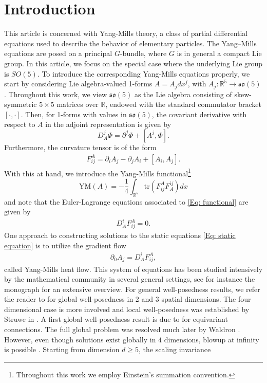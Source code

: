 \documentclass[11pt,reqno]{amsart}
\theoremstyle{remark}
\newcommand{\R}{\mathbb{R}}
\theoremstyle{definition}
\begin{document}
\section{Introduction}
This article is concerned with Yang-Mills theory, a class of partial differential equations used to describe the behavior of elementary particles. The Yang--Mills equations are posed on a principal $G$-bundle, where $G$ is in general a compact Lie group. In this article, we focus on the special case where the underlying Lie group is $SO(5)$. To introduce the corresponding Yang-Mills equations properly, we  start by considering Lie algebra-valued 1-forms $ A=A_j dx^j$, with $A_j: \R^5\to \mathfrak{so}(5)$. Throughout this work, we view $\mathfrak{so}(5)$ as the Lie algebra consisting of skew-symmetric $5\times 5$ matrices over $\R$, endowed with the standard commutator bracket $[\cdot,\cdot].$  Then, for 1-forms with values in $\mathfrak{so}(5)$, the 
covariant derivative with respect to $A$ in the adjoint representation
is given by
\[D^j_A \Phi = \partial^j \Phi + [A^j,\Phi].\]
Furthermore, the curvature tensor is of the form
\begin{align*}
    F_{ij}^A=\partial_i A_j-\partial_j A_i +[A_i,A_j].
\end{align*}
With this at hand, we introduce the Yang-Mills functional\footnote{Throughout this work we employ Einstein's summation convention.}
\begin{equation}\label{Eq: functional}
    \mathrm{YM}(A)=-\frac{1}{4}\int_{\R^5}  \text{tr}(F_{ij}^A F^{ij}_A) dx
\end{equation}
and note that the Euler-Lagrange equations associated to \eqref{Eq: functional} are given by
\begin{align}\label{Eq: static equation}
D^i_A F_{ij}^A=0.
\end{align}
One approach to constructing solutions to the static equations \eqref{Eq: static equation} is to utilize the gradient flow 
\begin{align}\label{Eq: heat flow}
    \partial_0 A_j = D^i_A F_{ij}^A,
\end{align}
called Yang-Mills heat flow. This system of equations has been studied intensively by the mathematical community in several general settings, see for instance the monograph \cite{Fee16} for an extensive overview. For general well-posedness results, we refer the reader to \cite{Rad92} for global well-posedness in 2 and 3 spatial dimensions. The four dimensional case is more involved and local well-posedness was established by Struwe in \cite{Str94}. A first global well-posedness result is due to  \cite{SchStrTah98} for equivariant connections. The full global problem was resolved much later by Waldron \cite{Wal19}. However, even though solutions exist globally in $4$ dimensions, blowup at infinity is possible \cite{SirWerZheZho26}. Starting from dimension $d\geq 5$, the scaling invariance 
\end{document}
